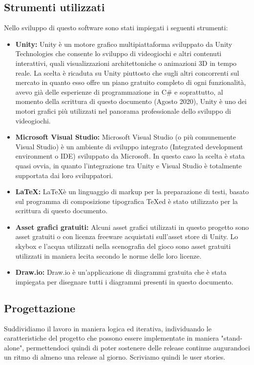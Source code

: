 \documentclass[12pt]{article}
\begin{document}
\subsection{Strumenti utilizzati}
Nello sviluppo di questo software sono stati impiegati i seguenti strumenti:

\begin{itemize}
\item{\textbf{Unity:}} Unity è un motore grafico multipiattaforma sviluppato da Unity Technologies che consente lo sviluppo di videogiochi e altri contenuti interattivi, quali visualizzazioni architettoniche o animazioni 3D in tempo reale. La scelta è ricaduta su Unity piuttosto che sugli altri concorrenti sul mercato in quanto esso offre un piano gratuito completo di ogni funzionalità, avevo già delle esperienze di programmazione in C\# e soprattutto, al momento della scrittura di questo documento (Agosto 2020), Unity è uno dei motori grafici più utilizzati nel panorama professionale dello sviluppo di videogiochi.
\item{\textbf{Microsoft Visual Studio:}} Microsoft Visual Studio (o più comunemente Visual Studio) è un ambiente di sviluppo integrato (Integrated development environment o IDE) sviluppato da Microsoft. In questo caso la scelta è stata quasi ovvia, in quanto l'integrazione tra Unity e Visual Studio è totalmente supportata dai loro sviluppatori.
\item{\textbf{\LaTeX:}} \LaTeX è un linguaggio di markup per la preparazione di testi, basato sul programma di composizione tipografica \TeX ed è stato utilizzato per la scrittura di questo documento.
\item{\textbf{Asset grafici gratuiti:}} Alcuni asset grafici utilizzati in questo progetto sono asset gratuiti o con licenza freeware acquistati sull'asset store di Unity. Lo skybox e l'acqua utilizzati nella scenografia del gioco sono asset gratuiti utilizzati in maniera lecita secondo le norme delle loro licenze.
\item{\textbf{Draw.io:}} Draw.io è un'applicazione di diagrammi gratuita che è stata impiegata per disegnare tutti i diagrammi presenti in questo documento.
\end{itemize}

\subsection{Progettazione}
Suddividiamo il lavoro in maniera logica ed iterativa, individuando le caratteristiche del progetto che possono essere implementate in maniera "stand-alone", permettendoci quindi di poter sostenere delle release continue augurandoci un ritmo di almeno una release al giorno. Scriviamo quindi le user stories.
\newline
\end{document}
